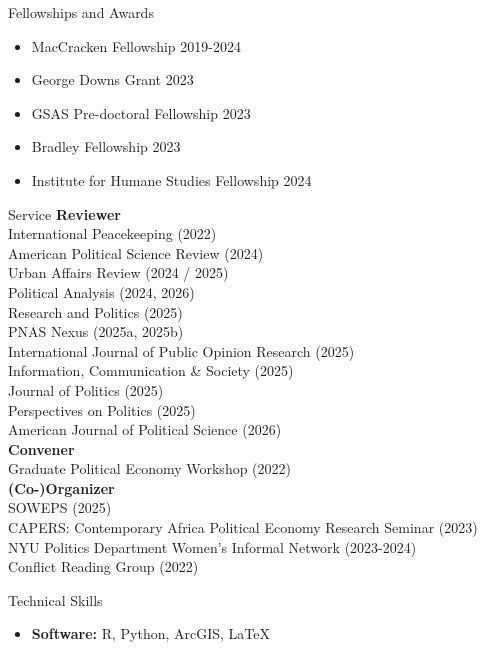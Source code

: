 \documentclass{resume} %
\begin{document}
	\begin{rSection}{Fellowships and Awards}
		\bigskip
		\begin{itemize}
			\item MacCracken Fellowship \hfill 2019-2024
			\item George Downs Grant \hfill 2023
			\item GSAS Pre-doctoral Fellowship \hfill 2023
			\item Bradley Fellowship \hfill 2023
			\item Institute for Humane Studies Fellowship \hfill 2024
		\end{itemize}
		
	\end{rSection}
	\begin{rSection}{Service}
		\bigskip
		\textbf{Reviewer} \\
		International Peacekeeping (2022)\\
		American Political Science Review (2024)\\
		Urban Affairs Review (2024 / 2025)\\
		Political Analysis (2024, 2026)\\
		Research and Politics (2025)\\
		PNAS Nexus (2025a, 2025b)\\
		International Journal of Public Opinion Research (2025)\\
		Information, Communication \& Society (2025)\\
		Journal of Politics (2025)\\
		Perspectives on Politics (2025)\\
		American Journal of Political Science (2026)\\
		\textbf{Convener}\\
		Graduate Political Economy Workshop (2022)\\
		\textbf{(Co-)Organizer}\\
		SOWEPS (2025)\\
		CAPERS: Contemporary Africa Political Economy Research Seminar (2023)\\
		NYU Politics Department Women’s Informal Network (2023-2024)\\
		Conflict Reading Group (2022)\\
		
	\end{rSection}
	
	\begin{rSection}{Technical Skills}
		\bigskip
		\begin{itemize}
			\item \textbf{Software:} R, Python, ArcGIS, LaTeX
		\end{itemize}
	\end{rSection}
	
	
\end{document}
